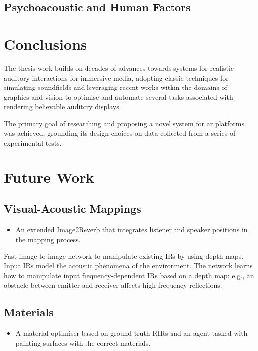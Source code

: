 \subsection{Psychoacoustic and Human Factors}


\section{Conclusions}
The thesis work builds on decades of advances towards systems for realistic auditory interactions for immersive media, adopting classic techniques for simulating soundfields and leveraging recent works within the domains of graphics and vision to optimise and automate several tasks associated with rendering believable auditory displays.\par
The primary goal of researching and proposing a novel system for \acrshort{ar} platforms was achieved, grounding its design choices on data collected from a series of experimental tests.

\section{Future Work}

\subsection{Visual-Acoustic Mappings}
\begin{itemize}
    \item An extended Image2Reverb that integrates listener and speaker positions in the mapping process.
\end{itemize}

Fast image-to-image network to manipulate existing IRs by using depth maps. Input IRs model the acoustic phenomena of the environment. The network learns how to manipulate input frequency-dependent IRs based on a depth map: e.g., an obstacle between emitter and receiver affects high-frequency reflections.

\subsection{Materials}
\begin{itemize}
    \item A material optimiser based on ground truth RIRs and an agent tasked with painting surfaces with the correct materials.
\end{itemize}

